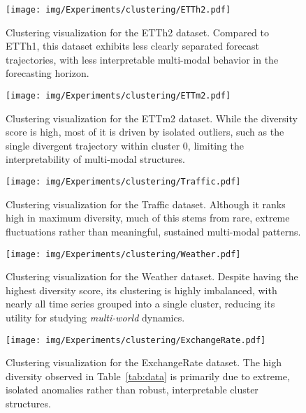 \documentclass[a4paper,oneside,bibliography=totoc]{scrbook}
\begin{document}
\begin{figure}[h]
     \centering
        \texttt{[image: img/Experiments/clustering/ETTh2.pdf]}
        \caption{Clustering visualization for the ETTh2 dataset. Compared to ETTh1, this dataset exhibits less clearly separated forecast trajectories, with less interpretable multi-modal behavior in the forecasting horizon.}
        \label{fig:clustering-etth2}
\end{figure}
\begin{figure}[h]
     \centering
        \texttt{[image: img/Experiments/clustering/ETTm2.pdf]}
        \caption{Clustering visualization for the ETTm2 dataset. While the diversity score is high, most of it is driven by isolated outliers, such as the single divergent trajectory within cluster 0, limiting the interpretability of multi-modal structures.}
        \label{fig:clustering-ettm2}
\end{figure}


\begin{figure}
     \centering
        \texttt{[image: img/Experiments/clustering/Traffic.pdf]}
        \caption{Clustering visualization for the Traffic dataset. Although it ranks high in maximum diversity, much of this stems from rare, extreme fluctuations rather than meaningful, sustained multi-modal patterns.}
        \label{fig:clustering-traffic}
\end{figure}

\begin{figure}
     \centering
        \texttt{[image: img/Experiments/clustering/Weather.pdf]}
        \caption{Clustering visualization for the Weather dataset. Despite having the highest diversity score, its clustering is highly imbalanced, with nearly all time series grouped into a single cluster, reducing its utility for studying \textit{multi-world} dynamics.}
        \label{fig:clustering-weather}
\end{figure}

\begin{figure}
     \centering
        \texttt{[image: img/Experiments/clustering/ExchangeRate.pdf]}
        \caption{Clustering visualization for the ExchangeRate dataset. The high diversity observed in Table~\ref{tab:data} is primarily due to extreme, isolated anomalies rather than robust, interpretable cluster structures.}
        \label{fig:clustering-exchange_rate}
\end{figure}
\end{document}
